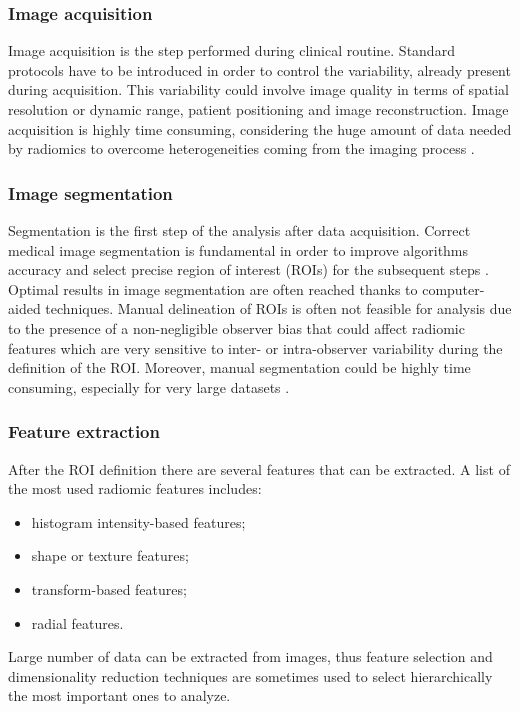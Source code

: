 \documentclass[../main.tex]{subfiles}
\begin{document}
\subsubsection{Image acquisition}

Image acquisition is the step performed during clinical routine. 
Standard protocols have to be introduced in order to control the variability, already present during acquisition. 
This variability could involve image quality in terms of spatial resolution or dynamic range, patient positioning and image reconstruction. 
Image acquisition is highly time consuming, considering the huge amount of data needed by radiomics to overcome heterogeneities coming from the imaging process \cite{kumar2012radiomics}.

\subsubsection{Image segmentation}

Segmentation is the first step of the analysis after data acquisition.
Correct medical image segmentation is fundamental in order to improve algorithms accuracy and select precise region of interest (ROIs) for the subsequent steps \cite{biondi2021classification}.
Optimal results in image segmentation are often reached thanks to computer-aided techniques. 
Manual delineation of ROIs is often not feasible for analysis due to the presence of a non-negligible observer bias that could affect radiomic features which are very sensitive to inter- or intra-observer variability during the definition of the ROI.
Moreover, manual segmentation could be  highly time consuming, especially for very large datasets \cite{van2020radiomics-guide}.

\subsubsection{Feature extraction}

After the ROI definition there are several features that can be extracted. 
A list of the most used radiomic features \cite{van2020radiomics-guide} includes: \begin{itemize}
    \item histogram intensity-based features;
    \item shape or texture features;
    \item transform-based features;
    \item radial features.
\end{itemize}   
Large number of data can be extracted from images, thus  feature selection and dimensionality reduction techniques are sometimes used to select hierarchically  the most important ones to analyze.
\end{document}
